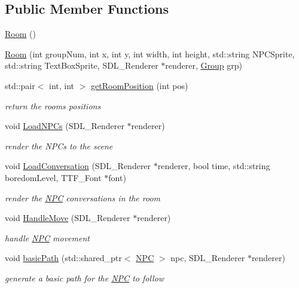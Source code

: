 \subsection*{Public Member Functions}
\begin{DoxyCompactItemize}
\item 
\hyperlink{class_room_ac6ef93a7d9c3e1d624e025058d5f16ff}{Room} ()
\item 
\hyperlink{class_room_a2f37c248b2d9882531e01ab675ea54f0}{Room} (int group\+Num, int x, int y, int width, int height, std\+::string N\+P\+C\+Sprite, std\+::string Text\+Box\+Sprite, S\+D\+L\+\_\+\+Renderer $\ast$renderer, \hyperlink{class_group}{Group} grp)
\item 
std\+::pair$<$ int, int $>$ \hyperlink{class_room_ac57c28e2c1048649e816f731f63f9daf}{get\+Room\+Position} (int pos)
\begin{DoxyCompactList}\small\item\em return the rooms positions \end{DoxyCompactList}\item 
void \hyperlink{class_room_a876301b35488a7dc07bde00f0b701f9a}{Load\+N\+P\+Cs} (S\+D\+L\+\_\+\+Renderer $\ast$renderer)
\begin{DoxyCompactList}\small\item\em render the N\+P\+Cs to the scene \end{DoxyCompactList}\item 
void \hyperlink{class_room_a85476905ce9262f07dbb4a25f9729545}{Load\+Conversation} (S\+D\+L\+\_\+\+Renderer $\ast$renderer, bool time, std\+::string boredom\+Level, T\+T\+F\+\_\+\+Font $\ast$font)
\begin{DoxyCompactList}\small\item\em render the \hyperlink{class_n_p_c}{N\+PC} conversations in the room \end{DoxyCompactList}\item 
void \hyperlink{class_room_ae40e34ac3588b2dfe2be6c5d66e20552}{Handle\+Move} (S\+D\+L\+\_\+\+Renderer $\ast$renderer)
\begin{DoxyCompactList}\small\item\em handle \hyperlink{class_n_p_c}{N\+PC} movement \end{DoxyCompactList}\item 
void \hyperlink{class_room_af25611552daa6c57915a0b0c98c40a8a}{basic\+Path} (std\+::shared\+\_\+ptr$<$ \hyperlink{class_n_p_c}{N\+PC} $>$ npc, S\+D\+L\+\_\+\+Renderer $\ast$renderer)
\begin{DoxyCompactList}\small\item\em generate a basic path for the \hyperlink{class_n_p_c}{N\+PC} to follow \end{DoxyCompactList}\item 

\end{DoxyCompactItemize}
